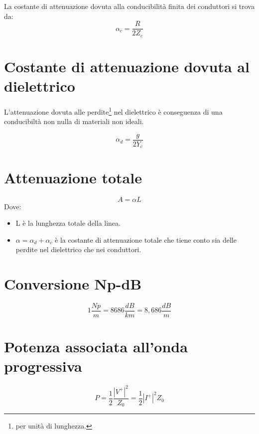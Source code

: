 			La costante di attenuazione dovuta alla conducibilità finita dei conduttori si trova da:
			\begin{equation}
			\alpha_c=\frac{R}{2Z_c}
			\end{equation}
		
	\section{Costante di attenuazione dovuta al dielettrico}
	
			L'attenuazione dovuta alle perdite\footnote{per unità di lunghezza.} nel dielettrico è conseguenza di una conducibiltà non nulla di materiali non ideali.

			\begin{equation}
			\alpha_d=\frac{g}{2Y_c}
			\end{equation}

	\section{Attenuazione totale}

			\begin{equation}
			A=\alpha L
			\end{equation}
			Dove:
			\begin{itemize}
			\item L è la lunghezza totale della linea.
			\item $\alpha=\alpha_d+\alpha_c$ è la costante di attenuazione totale che tiene conto sia delle perdite nel dielettrico che nei conduttori.
			\end{itemize}

	\section{Conversione Np-dB}

	\begin{equation}
	1\frac{Np}{m}=8686\frac{dB}{km}=8,686\frac{dB}{m}
	\end{equation}
	
	\section{Potenza associata all'onda progressiva}

			\begin{equation}
			P=\frac{1}{2}\frac{|V^+|^2}{Z_0}=\frac{1}{2}|I^+|^2 Z_0
			\end{equation}

